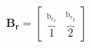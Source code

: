 \documentclass[preview]{standalone}
\begin{document}
\begin{align*}
{\mathbf{B_{r}} = \begin{bmatrix} \overbrace{1}^{\textrm{b}_{r_x}}& \overbrace{2}^{\textrm{b}_{r_y}} \end{bmatrix}}
\end{align*}
\end{document}
